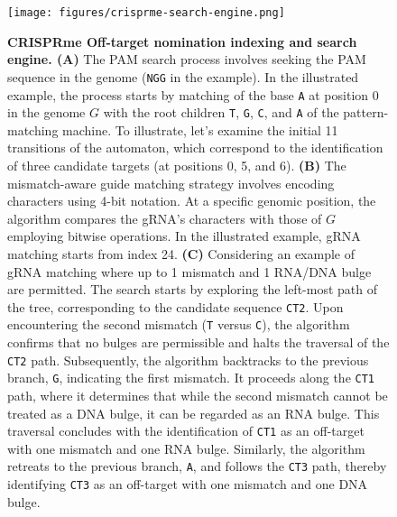 \documentclass[a4paper, titlepage, openright]{book}
\newcommand{\crisprme}{CRISPRme\xspace}
\begin{document}
\begin{figure}[!]
    \centering
    \texttt{[image: figures/crisprme-search-engine.png]}
    \caption[\crisprme Off-target nomination indexing and search engine]{\textbf{\crisprme Off-target nomination indexing and search engine. (A)} The PAM search process involves seeking the PAM sequence in the genome (\texttt{NGG} in the example). In the illustrated example, the process starts by matching of the base \texttt{A} at position 0 in the genome $G$ with the root children \texttt{T}, \texttt{G}, \texttt{C}, and \texttt{A} of the pattern-matching machine. To illustrate, let's examine the initial 11 transitions of the automaton, which correspond to the identification of three candidate targets (at positions 0, 5, and 6). \textbf{(B)} The mismatch-aware guide matching strategy involves encoding characters using 4-bit notation. At a specific genomic position, the algorithm compares the gRNA's characters with those of $G$ employing bitwise operations. In the illustrated example, gRNA matching starts from index 24. \textbf{(C)} Considering an example of gRNA matching where up to 1 mismatch and 1 RNA/DNA bulge are permitted. The search starts by exploring the left-most path of the tree, corresponding to the candidate sequence \texttt{CT2}. Upon encountering the second mismatch (\texttt{T} versus \texttt{C}), the algorithm confirms that no bulges are permissible and halts the traversal of the \texttt{CT2} path. Subsequently, the algorithm backtracks to the previous branch, \texttt{G}, indicating the first mismatch. It proceeds along the \texttt{CT1} path, where it determines that while the second mismatch cannot be treated as a DNA bulge, it can be regarded as an RNA bulge. This traversal concludes with the identification of \texttt{CT1} as an off-target with one mismatch and one RNA bulge. Similarly, the algorithm retreats to the previous branch, \texttt{A}, and follows the \texttt{CT3} path, thereby identifying \texttt{CT3} as an off-target with one mismatch and one DNA bulge.}
    \label{fig:crisprme-search-engine}
\end{figure}

\end{document}
